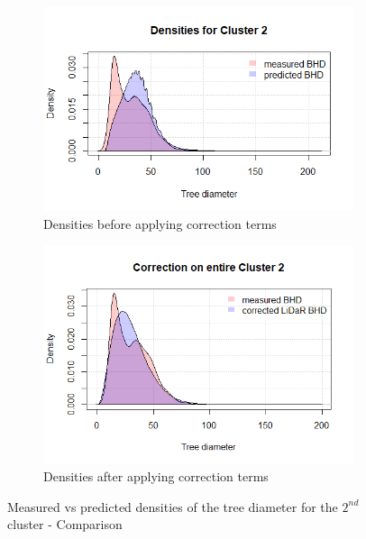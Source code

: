 \begin{figure}[H]
\centering
\begin{subfigure}{.5\textwidth}
  \centering
  \includegraphics[width=.9\linewidth]{dens2.png}
  \caption{Densities before applying correction terms}
  \label{fig:dens2}
\end{subfigure}%
\begin{subfigure}{.5\textwidth}
  \centering
  \includegraphics[width=0.845\linewidth]{correction_entire_cluster2.png}
  \caption{Densities after applying correction terms}
  \label{fig:cluster2_pred}
\end{subfigure}
\caption{Measured vs predicted densities of the tree diameter for the $2^{nd}$ cluster - Comparison}
\label{fig:cluster2_entire_corrected}
\end{figure}

